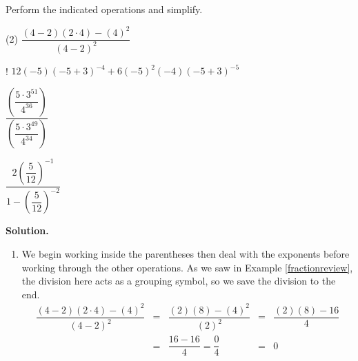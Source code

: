 \begin{ex} \label{exponentreview}  Perform the indicated operations and simplify.

\begin{tasks}(2)
\task  $\dfrac{(4-2)(2 \cdot 4)-(4)^2}{(4-2)^2}$

\task! $12(-5)(-5+3)^{-4}+6(-5)^2(-4)(-5+3)^{-5}$

\task  $\dfrac{\left(\dfrac{5\cdot 3^{51}}{4^{36}}\right)}{\left(\dfrac{5 \cdot 3^{49}}{4^{34}}\right)}$

\task $\dfrac{2 \left(\dfrac{5}{12}\right)^{-1}}{1 - \left(\dfrac{5}{12}\right)^{-2}}$

\end{tasks}

{\bf Solution.}

\begin{enumerate}

\item  We begin working inside the parentheses then deal with the exponents before working through the other operations.  As we saw in Example \ref{fractionreview}, the division here acts as a grouping symbol, so we save the division to the end.\[ \begin{array}{rclcl}

\dfrac{(4-2)(2 \cdot 4)-(4)^2}{(4-2)^2} & = & \dfrac{(2)(8)-(4)^2}{(2)^2} & = & \dfrac{(2)(8)-16}{4} \\ [10pt]
                                        & = & \dfrac{16-16}{4} = \dfrac{0}{4} & = & 0 \\ \end{array}\]


\end{enumerate}
\end{ex}
